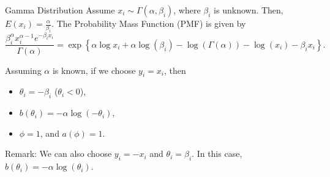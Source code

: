\documentclass[UTF8,a4paper,10pt]{article}
\begin{document}
  
\begin{mybox}{Gamma Distribution}
Assume $x_i \sim \Gamma(\alpha, \beta_i)$, where $\beta_i$ is unknown. Then, $E(x_i) = \frac{\alpha}{\beta_i}$. The Probability Mass Function (PMF) is given by
\[
\frac{\beta_i^\alpha x_i^{\alpha-1} e^{-\beta_i x_i}}{\Gamma(\alpha)} = \exp\left\{\alpha\log x_i + \alpha\log(\beta_i) - \log(\Gamma(\alpha)) - \log(x_i) - \beta_i x_i\right\}.
\]

Assuming $\alpha$ is known, if we choose $y_i = x_i$, then 
\begin{itemize}
  \item $\theta_i = -\beta_i$ ($\theta_i < 0$), 
  \item $b(\theta_i) = -\alpha\log(-\theta_i)$, 
  \item $\phi = 1$, and $a(\phi) = 1$.
\end{itemize}

Remark: We can also choose 
$y_i = -x_i$ and $\theta_i = \beta_i$. In this case, $b(\theta_i) = -\alpha\log(\theta_i)$.

\end{mybox}



\end{document}
